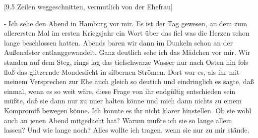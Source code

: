 \def\day{{\color{red} [22. 7. 1944] }}
\mktitle
{\color{red} [9.5 Zeilen weggeschnitten, vermutlich von der Ehefrau] }

- Ich sehe den Abend in Hamburg vor mir.
Es ist der Tag gewesen, an dem zum allerersten Mal im ersten Kriegsjahr ein Wort \"{u}ber das fiel was die Herzen schon lange beschlossen hatten.
Abends baren wir dann im Dunkeln schon an der Au{\ss}enalster entlanggewandelt.
Ganz deutlich sehe ich das M\"{a}dchen vor mir.
Wir standen auf dem Steg, rings lag das tiefschwarze Wasser nur nach Osten hin \st{fols} flo{\ss} das glitzernde Mondeslicht in silbernen Str\"{o}men.
Dort war es, als ihr mit meinem Versprechen zur Ehe auch gleich so deutich und eindringlich es sagte, da{\ss} einmal, wenn es so weit w\"{a}re, diese Frage von ihr endg\"{u}ltig entschieden sein m\"{u}{\ss}te, da{\ss} sie dann nur zu mier halten k\"{o}nne und mich dann nichts zu einem Kompromi{\ss} bewegen k\"{o}nne.
Ich konnte es ihr nicht klarer hinstellen.
Ob sie wohl auch an jenen Abend mitgedacht hat?
Warum mu{\ss}te ich sie so lange allein lassen?
Und wie lange noch?
Alles wollte ich tragen, wenn sie nur zu mir st\"{a}nde.

\clearpage
